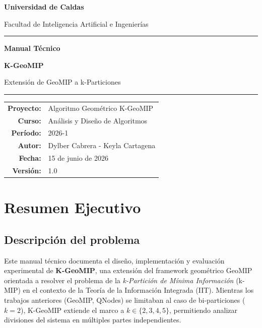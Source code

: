 \documentclass[12pt,letterpaper]{article}
\theoremstyle{definition}
\theoremstyle{remark}
\begin{document}
\begin{titlepage}
  \centering
  \vspace*{1.5cm}
  {\Large\bfseries Universidad de Caldas\par}
  {\large Facultad de Inteligencia Artificial e Ingenierías\par}
  \vspace{0.5cm}
  \rule{\linewidth}{1pt}
  \vspace{1cm}

  {\Huge\bfseries\color{KGeoBlue} Manual Técnico\par}
  \vspace{0.4cm}
  {\LARGE\bfseries K-GeoMIP\par}
  \vspace{0.3cm}
  {\large Extensión de GeoMIP a k-Particiones\par}
  \vspace{1cm}
  \rule{\linewidth}{0.5pt}
  \vspace{1cm}

  {\large
    \begin{tabular}{rl}
      \textbf{Proyecto:} & Algoritmo Geométrico K-GeoMIP \\[4pt]
      \textbf{Curso:}    & Análisis y Diseño de Algoritmos \\[4pt]
      \textbf{Período:}  & 2026-1 \\[4pt]
      \textbf{Autor:}    & Dylber Cabrera - Keyla Cartagena \\[4pt]
      \textbf{Fecha:}    & 15 de junio de 2026 \\[4pt]
      \textbf{Versión:}  & 1.0 \\
    \end{tabular}
  }
  \vfill
\end{titlepage}

\tableofcontents
\newpage

\section{Resumen Ejecutivo}

\subsection{Descripción del problema}
Este manual técnico documenta el diseño, implementación y evaluación experimental de
\textbf{K-GeoMIP}, una extensión del framework geométrico GeoMIP orientada a resolver el
problema de la \emph{k-Partición de Mínima Información} (k-MIP) en el contexto de la
Teoría de la Información Integrada (IIT). Mientras los trabajos anteriores (GeoMIP,
QNodes) se limitaban al caso de bi-particiones ($k = 2$), K-GeoMIP extiende el marco a
$k \in \{2, 3, 4, 5\}$, permitiendo analizar divisiones del sistema en múltiples partes
independientes.
\end{document}
